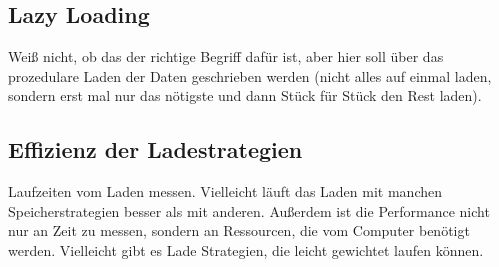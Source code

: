 \subsection{Lazy Loading}
Weiß nicht, ob das der richtige Begriff dafür ist, aber hier soll über das prozedulare 
Laden der Daten geschrieben werden (nicht alles auf einmal laden, sondern erst mal nur das
nötigste und dann Stück für Stück den Rest laden). 

\subsection{Effizienz der Ladestrategien}
Laufzeiten vom Laden messen. Vielleicht läuft das Laden mit manchen Speicherstrategien 
besser als mit anderen. Außerdem ist die Performance nicht nur an Zeit zu messen, sondern
an Ressourcen, die vom Computer benötigt werden. Vielleicht gibt es Lade Strategien, die
leicht gewichtet laufen können.